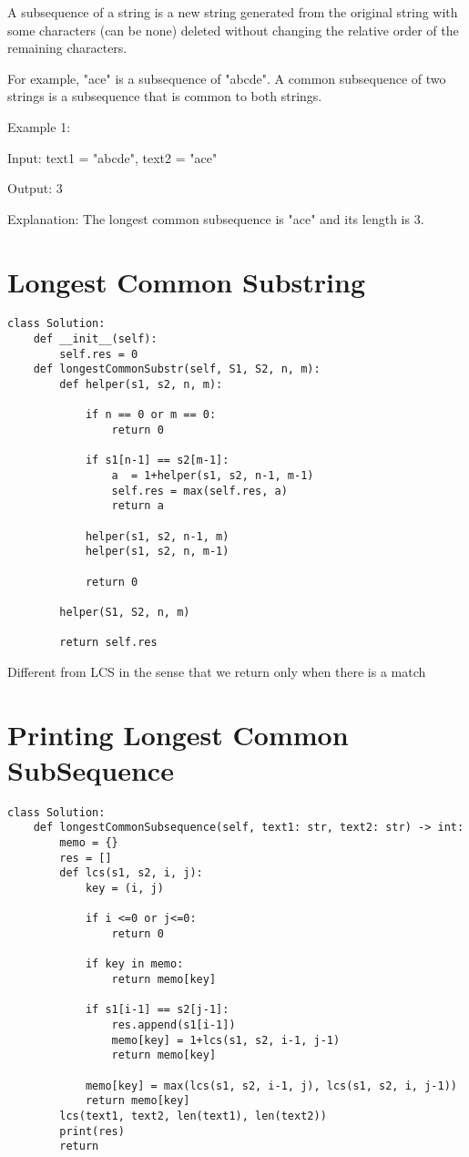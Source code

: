 \documentclass[24pt, a4]{article}
\begin{document}
A subsequence of a string is a new string generated from the original string with some characters (can be none) deleted without changing the relative order of the remaining characters.

For example, "ace" is a subsequence of "abcde".
A common subsequence of two strings is a subsequence that is common to both strings.

Example 1:

Input: text1 = "abcde", text2 = "ace" 

Output: 3  

Explanation: The longest common subsequence is "ace" and its length is 3.

\newpage
\section{Longest Common Substring}
\begin{lstlisting}
class Solution:
    def __init__(self):
        self.res = 0
    def longestCommonSubstr(self, S1, S2, n, m):
        def helper(s1, s2, n, m):

            if n == 0 or m == 0:
                return 0
            
            if s1[n-1] == s2[m-1]:
                a  = 1+helper(s1, s2, n-1, m-1)
                self.res = max(self.res, a)
                return a

            helper(s1, s2, n-1, m)
            helper(s1, s2, n, m-1)
            
            return 0

        helper(S1, S2, n, m)
        
        return self.res
\end{lstlisting}
Different from LCS in the sense that we return only when there is a match

\newpage
\section{Printing Longest Common SubSequence}
\begin{lstlisting}
class Solution:
    def longestCommonSubsequence(self, text1: str, text2: str) -> int:
        memo = {}
        res = []
        def lcs(s1, s2, i, j):
            key = (i, j)
            
            if i <=0 or j<=0:
                return 0
                
            if key in memo:
                return memo[key]
                
            if s1[i-1] == s2[j-1]:
                res.append(s1[i-1])
                memo[key] = 1+lcs(s1, s2, i-1, j-1)
                return memo[key]
            
            memo[key] = max(lcs(s1, s2, i-1, j), lcs(s1, s2, i, j-1))
            return memo[key]
        lcs(text1, text2, len(text1), len(text2))
        print(res)
        return 
\end{lstlisting}
\end{document}
